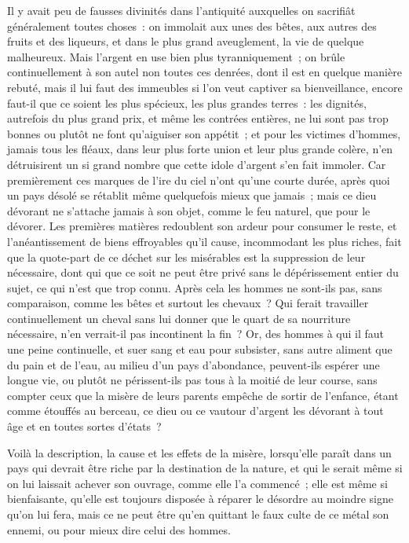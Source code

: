 \documentclass[french,twoside]{book} %
\begin{document}
Il y avait peu de fausses divinités dans l’antiquité auxquelles on sacrifiât généralement toutes choses : on immolait aux unes des bêtes, aux autres des fruits et des liqueurs, et dans le plus grand aveuglement, la vie de quelque malheureux. Mais l’argent en use bien plus tyranniquement ; on brûle continuellement à son autel non toutes ces denrées, dont il est en quelque manière rebuté, mais il lui faut des immeubles si l’on veut captiver sa bienveillance, encore faut-il que ce soient les plus spécieux, les plus grandes terres : les dignités, autrefois du plus grand prix, et même les contrées entières, ne lui sont pas trop bonnes ou plutôt ne font qu’aiguiser son appétit ; et pour les victimes d’hommes, jamais tous les fléaux, dans leur plus forte union et leur plus grande colère, n’en détruisirent un si grand nombre que cette idole d’argent s’en fait immoler. Car premièrement ces marques de l’ire du ciel n’ont qu’une courte durée, après quoi un pays désolé se rétablit même quelquefois mieux que jamais ; mais ce dieu dévorant ne s’attache jamais à son objet, comme le feu naturel, que pour le dévorer. Les premières matières redoublent son ardeur pour consumer le reste, et l’anéantissement de biens effroyables qu’il cause, incommodant les plus riches, fait que la quote-part de ce déchet sur les misérables est la suppression de leur nécessaire, dont qui que ce soit ne peut être privé sans le dépérissement entier du sujet, ce qui n’est que trop connu. Après cela les hommes ne sont-ils pas, sans comparaison, comme les bêtes et surtout les chevaux ? Qui ferait travailler continuellement un cheval sans lui donner que le quart de sa nourriture nécessaire, n’en verrait-il pas incontinent la fin ? Or, des hommes à qui il faut une peine continuelle, et suer sang et eau pour subsister, sans autre aliment que du pain et de l’eau, au milieu d’un pays d’abondance, peuvent-ils espérer une longue vie, ou plutôt ne périssent-ils pas tous à la moitié de leur course, sans compter ceux que la misère de leurs parents empêche de sortir de l’enfance, étant comme étouffés au berceau, ce dieu ou ce vautour d’argent les dévorant à tout âge et en toutes sortes d’états ?\par
Voilà la description, la cause et les effets de la misère, lorsqu’elle paraît dans un pays qui devrait être riche par la destination de la nature, et qui le serait même si on lui laissait achever son ouvrage, comme elle l’a commencé ; elle est même si bienfaisante, qu’elle est toujours disposée à réparer le désordre au moindre signe qu’on lui fera, mais ce ne peut être qu’en quittant le faux culte de ce métal son ennemi, ou pour mieux dire celui des hommes.\par
\end{document}
